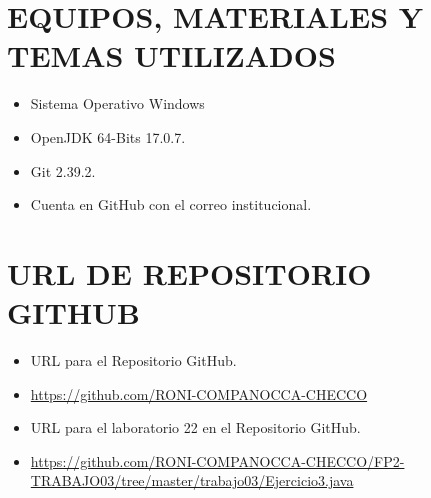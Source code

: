 \documentclass{article}
\begin{document}
    \section{EQUIPOS, MATERIALES Y TEMAS UTILIZADOS}
	\begin{itemize}
		\item Sistema Operativo Windows
		\item OpenJDK 64-Bits 17.0.7.
		\item Git 2.39.2.	
  	\item Cuenta en GitHub con el correo institucional.
	\end{itemize}

    \section{URL DE REPOSITORIO GITHUB}
	\begin{itemize}
		\item URL para el Repositorio GitHub.
		\item \url{https://github.com/RONI-COMPANOCCA-CHECCO}
		\item URL para el laboratorio 22 en el Repositorio GitHub.	
        \item \url{https://github.com/RONI-COMPANOCCA-CHECCO/FP2-TRABAJO03/tree/master/trabajo03/Ejercicio3.java}
	\end{itemize}
    
\end{document}
